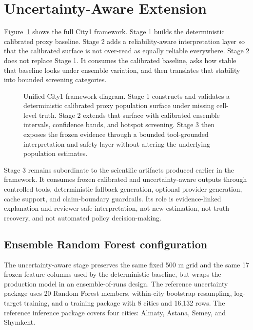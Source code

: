 \section{Uncertainty-Aware Extension}

Figure~\ref{fig:city1-framework} shows the full City1 framework. Stage 1 builds the deterministic calibrated proxy baseline. Stage 2 adds a reliability-aware interpretation layer so that the calibrated surface is not over-read as equally reliable everywhere. Stage 2 does not replace Stage 1. It consumes the calibrated baseline, asks how stable that baseline looks under ensemble variation, and then translates that stability into bounded screening categories.

\begin{figure}[H]
\centering

\caption{Unified City1 framework diagram. Stage 1 constructs and validates a deterministic calibrated proxy population surface under missing cell-level truth. Stage 2 extends that surface with calibrated ensemble intervals, confidence bands, and hotspot screening. Stage 3 then exposes the frozen evidence through a bounded tool-grounded interpretation and safety layer without altering the underlying population estimates.}
\label{fig:city1-framework}
\end{figure}

Stage 3 remains subordinate to the scientific artifacts produced earlier in the framework. It consumes frozen calibrated and uncertainty-aware outputs through controlled tools, deterministic fallback generation, optional provider generation, cache support, and claim-boundary guardrails. Its role is evidence-linked explanation and reviewer-safe interpretation, not new estimation, not truth recovery, and not automated policy decision-making.

\subsection{Ensemble Random Forest configuration}

The uncertainty-aware stage preserves the same fixed 500 m grid and the same 17 frozen feature columns used by the deterministic baseline, but wraps the production model in an ensemble-of-runs design. The reference uncertainty package uses 20 Random Forest members, within-city bootstrap resampling, log-target training, and a training package with 8 cities and 16,132 rows. The reference inference package covers four cities: Almaty, Astana, Semey, and Shymkent.

